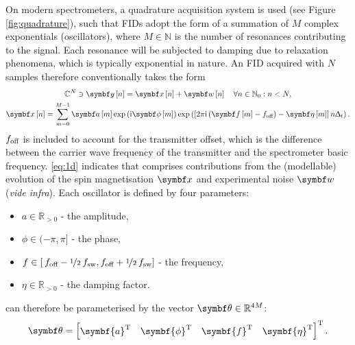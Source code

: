 On modern spectrometers, a quadrature acquisition system is used\cite[Appendix
A.5]{Levitt2007} (see Figure \ref{fig:quadrature}), such that \acp{FID} adopt
the form of a summation of $M$ complex exponentials (oscillators), where $M \in
\mathbb{N}$ is the number of resonances contributing to the signal. Each
resonance will be subjected to damping due to relaxation phenomena, which is
typically exponential in nature.  An \ac{FID} acquired with $N$ samples
therefore conventionally takes the form
\begin{subequations}
    \begin{gather}
        \CN \ni
        \by \left[n\right] =
            \bx \left[ n \right] +
            \bw \left[ n \right]
            \quad \forall n \in \mathbb{N}_0 : n < N,
            \label{eq:y=x+w} \\
        \bx \left[n\right] =
            \sum_{m=0}^{M-1} \bdam \exp\left(
                \iu \bdphim
            \right) \exp\left(
                \left[ 2 \pi \iu \left(\bdfm - \foff\right)- \bdetam \right] n \Dt
            \right).
            \label{eq:x}
    \end{gather}
    \label{eq:1d}%
\end{subequations}%
$f_{\text{off}}$ is included to account for the transmitter offset, which is the
difference between the carrier wave frequency of the transmitter and the
spectrometer basic frequency. \eqref{eq:1d} indicates that  comprises
contributions from the (modellable) evolution of the spin magnetisation $\bx$
and experimental noise $\bw$ (\emph{vide infra}). Each oscillator is defined by
four parameters:
\begin{itemize}
    \item $a \in \mathbb{R}_{>0}$ - the amplitude,
    \item $\phi \in (-\pi, \pi]$ - the phase,
    \item $f \in \left[\hspace*{2pt}f_{\text{off}} - \nicefrac{1}{2} \hspace*{2pt}
        f_{\mathrm{sw}}, f_{\text{off}} + \nicefrac{1}{2} \hspace*{2pt}f_{\mathrm{sw}} \right]$ - the frequency,
    \item $\eta \in \mathbb{R}_{>0}$ - the damping factor.
\end{itemize}%
 can therefore be parameterised by the vector $\bth \in
\mathbb{R}^{4M}$:
\begin{equation}
    \bth =
    \begin{bmatrix}
        \symbf{a}\T & \symbf{\phi}\T & \symbf{f}\T & \symbf{\eta}\T
    \end{bmatrix}\T.
\end{equation}

